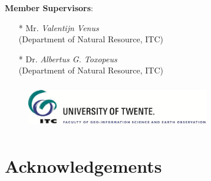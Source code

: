 \documentclass[11pt]{article}
\begin{document}
\vspace{2em}

\textbf{Member Supervisors}: \\
\begin{itemize}
	\item[* ] Mr. \textit{Valentijn Venus} \dotfill \\ (Department of Natural Resource, ITC)
	\item[* ] Dr. \textit{Albertus G. Toxopeus} \dotfill \\ (Department of Natural Resource, ITC)
\end{itemize}

\begin{figure}[h]
	\begin{center}
	\includegraphics[height=2cm,width=8cm]{ITC-logo.jpg}
	\end{center}
\end{figure}
\pagebreak

\section*{}
	\tableofcontents 
\pagebreak

\section*{Acknowledgements}
\end{document}
